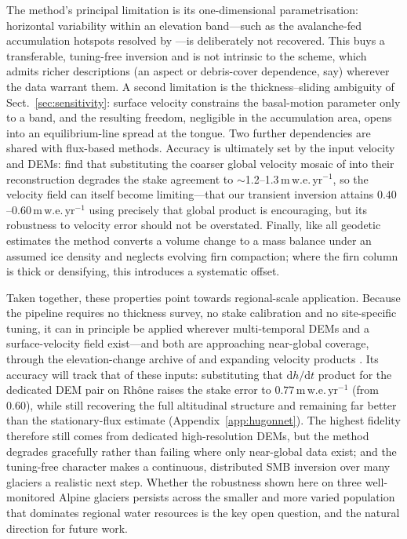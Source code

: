 The method's principal limitation is its one-dimensional parametrisation: horizontal
variability within an elevation band---such as the avalanche-fed accumulation
hotspots resolved by \citet{kneib2024}---is deliberately not recovered. This buys a
transferable, tuning-free inversion and is not intrinsic to the scheme, which admits
richer descriptions (an aspect or debris-cover dependence, say) wherever the data
warrant them. A second limitation is the thickness--sliding ambiguity of
Sect.~\ref{sec:sensitivity}: surface velocity constrains the basal-motion parameter
only to a band, and the resulting freedom, negligible in the accumulation area, opens
into an equilibrium-line spread at the tongue. Two further dependencies are shared
with flux-based methods. Accuracy is ultimately set by the input velocity and DEMs:
\citet{kneib2024} find that substituting the coarser global velocity mosaic of
\citet{millan2022} into their reconstruction degrades the stake agreement to
$\sim$1.2--1.3$\,\mathrm{m\,w.e.\,yr^{-1}}$, so the velocity field can itself become
limiting---that our transient inversion attains $0.40$--$0.60\,\mathrm{m\,w.e.\,yr^{-1}}$
using precisely that global product is encouraging, but its robustness to velocity
error should not be overstated. Finally, like all geodetic estimates the method
converts a volume change to a mass balance under an assumed ice density and neglects
evolving firn compaction; where the firn column is thick or densifying, this
introduces a systematic offset.

Taken together, these properties point towards regional-scale application. Because the
pipeline requires no thickness survey, no stake calibration and no site-specific
tuning, it can in principle be applied wherever multi-temporal DEMs and a
surface-velocity field exist---and both are approaching near-global coverage, through
the elevation-change archive of \citet{hugonnet2021} and expanding velocity products
\citep{millan2022}. Its accuracy will track that of these inputs: substituting that
$\mathrm{d}h/\mathrm{d}t$ product for the dedicated DEM pair on
Rhône raises the stake error to $0.77\,\mathrm{m\,w.e.\,yr^{-1}}$ (from $0.60$),
while still
recovering the full altitudinal structure and remaining far better than the
stationary-flux estimate (Appendix~\ref{app:hugonnet}). The highest fidelity therefore
still comes from dedicated high-resolution DEMs, but the method degrades gracefully
rather than failing where only near-global data exist; and the tuning-free character
makes a continuous, distributed SMB inversion over many glaciers a realistic next
step. Whether the robustness shown here on three well-monitored Alpine glaciers
persists across the smaller and more varied population that dominates regional water
resources is the key open question, and the natural direction for future work.
